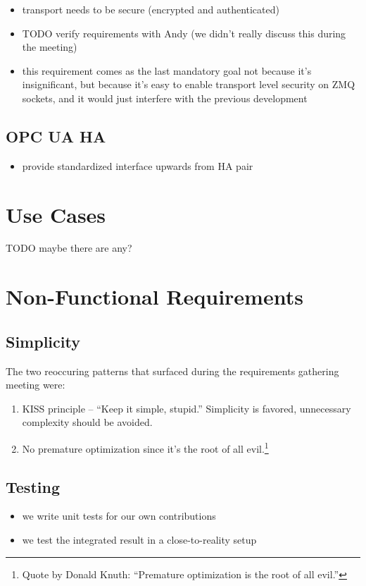 \begin{itemize}
	\item transport needs to be secure (encrypted and authenticated)
	\item TODO verify requirements with Andy (we didn't really discuss this
		during the meeting)
	\item this requirement comes as the last mandatory goal not because
		it's insignificant, but because it's easy to enable transport
		level security on ZMQ sockets, and it would just interfere with
		the previous development
\end{itemize}

\subsection{OPC UA HA}
\begin{itemize}
	\item provide standardized interface upwards from HA pair
\end{itemize}

\section{Use Cases}
TODO maybe there are any?

\section{Non-Functional Requirements}
\subsection{Simplicity}
The two reoccuring patterns that surfaced during the requirements gathering
meeting were:

\begin{enumerate}
\item KISS principle -- ``Keep it simple, stupid.'' Simplicity is favored,
	unnecessary complexity should be avoided.

\item No premature optimization since it's the root of all evil.\footnote{Quote
	by Donald Knuth: ``Premature optimization is the root of all evil.''}
\end{enumerate}


\subsection{Testing}
\begin{itemize}
	\item we write unit tests for our own contributions
	\item we test the integrated result in a close-to-reality setup
\end{itemize}


